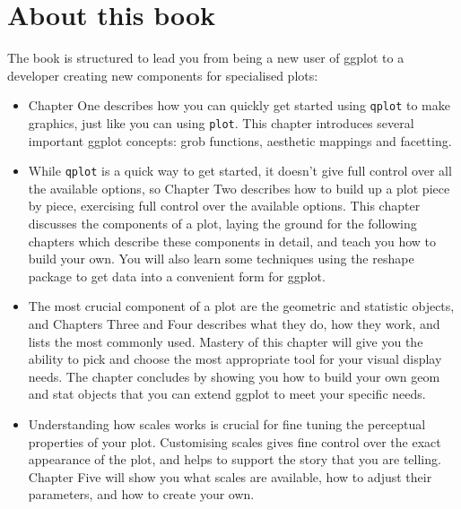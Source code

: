 \section{About this book}\label{sec:about_this_book}


The book is structured to lead you from being a new user of ggplot to a developer creating new components for specialised plots:

\begin{itemize}
	\item Chapter One describes how you can quickly get started using {\tt qplot} to make graphics, just like you can using {\tt plot}.  This chapter introduces several important ggplot concepts: grob functions, aesthetic mappings and facetting.
	
	\item While {\tt qplot} is a quick way to get started, it doesn't give full control over all the  available options, so Chapter Two describes how to build up a plot piece by piece, exercising full control over the available options.  This chapter discusses the components of a plot, laying the ground for the following chapters which describe these components in detail, and teach you how to build your own.  You will also learn some techniques using the reshape package to get data into a convenient form for ggplot.

	\item The most crucial component of a plot are the geometric and statistic objects, and Chapters Three and Four describes what they do, how they work, and lists the most commonly used.  Mastery of this chapter will give you the ability to pick and choose the most appropriate tool for your visual display needs.  The chapter concludes by showing you how to build your own geom and stat objects that you can extend ggplot to meet your specific needs.

	\item Understanding how scales works is crucial for fine tuning the perceptual properties of your plot.  Customising scales gives fine control over the exact appearance of the plot, and helps to support the story that you are telling.  Chapter Five will show you what scales are available, how to adjust their parameters, and how to create your own.


\end{itemize}
